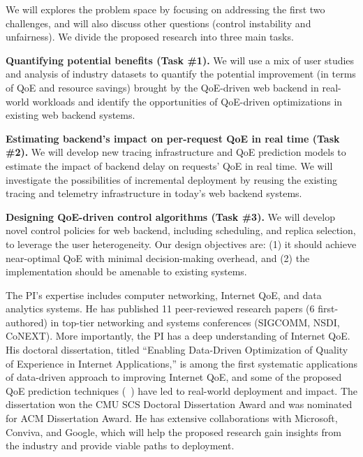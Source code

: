 We will explores the problem space by focusing on addressing the first two challenges, and will also discuss other questions (\eg control instability and unfairness).
We divide the proposed research into three main tasks. 

\begin{packedenumerate}
\item{\bf Quantifying potential benefits (Task \#1).}
We will use a mix of user studies and analysis of industry datasets to quantify the potential improvement (in terms of QoE and resource savings) brought by the QoE-driven web backend in real-world workloads and identify the opportunities of QoE-driven optimizations in existing web backend systems.%

\item{\bf Estimating backend's impact on per-request QoE in real time (Task \#2).}
We will develop new tracing infrastructure and QoE prediction models to estimate the impact of backend delay on requests' QoE in real time. We will investigate the possibilities of incremental deployment by reusing the existing tracing and telemetry infrastructure in today's web backend systems.

\item{\bf Designing QoE-driven control algorithms (Task \#3).}
We will develop novel control policies for web backend, including scheduling, and replica selection, to leverage the user heterogeneity. Our design objectives are: (1) it should achieve near-optimal QoE with minimal decision-making overhead, and (2) the implementation should be amenable to existing systems.

\end{packedenumerate}


The PI's expertise includes computer networking, Internet QoE, and data analytics systems.
He has published 11 peer-reviewed research papers (6 first-authored) in top-tier networking and systems conferences (\ie SIGCOMM, NSDI, CoNEXT).
More importantly, the PI has a deep understanding of Internet QoE. His doctoral dissertation, titled ``Enabling Data-Driven Optimization of Quality of Experience in Internet Applications,'' is among the first systematic applications of data-driven approach to improving Internet QoE, and some of the proposed QoE prediction techniques (\eg~\cite{cfa,c3}) have led to real-world deployment and impact. The dissertation won the CMU SCS Doctoral Dissertation Award and was nominated for ACM Dissertation Award.
He has extensive collaborations with Microsoft, Conviva, and Google, which will help the proposed research gain insights from the industry and provide viable paths to deployment.

